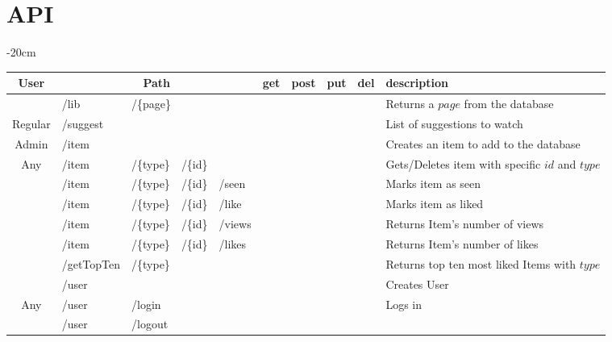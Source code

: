 \documentclass{article}
\newcommand{\xmark}{\ding{53}} %
\begin{document}
\section{API}
\label{sec:api}
\begin{table}[H]
  \centering
  \addtolength{\leftskip} {-20cm}
  \addtolength{\rightskip}{-20cm}
  \begin{adjustbox}{width=1.6\textwidth}
  \begin{tabular}{ c|l l l l|c|c|c|c|l }
    \rowcolor{Gray}
    User & \multicolumn{4}{c|}{Path} & get & post & put & del & description 
    \\ \hline
    & /lib & \multicolumn{3}{l|}{/\{page\}} &
    \xmark & & & &
    Returns a $page$ from the database
    \\
    \multirow{-2}{*}{Regular} & 
    \multicolumn{4}{l|}{/suggest} &
     & \xmark & & &
    List of suggestions to watch
    \\ \hhline{-|----|-|-|-|-|~} \rowcolor{Gray}
    Admin & /item & & & &
    & \xmark & & &
    Creates an item to add to the database
    \\ \hhline{-|----|-|-|-|-|~}
    Any &
    /item & /\{type\} & /\{id\} & &
    \xmark & & & \xmark &
    Gets/Deletes item with specific $id$ and $type$ 
    \\ \hhline{-|----|-|-|-|-|~} \rowcolor{Gray}
    & /item & /\{type\} & /\{id\} & /seen &
    & & \xmark & &
    Marks item as seen
    \\ \rowcolor{Gray}
    \multirow{-2}{*}{Regular}
    & /item & /\{type\} & /\{id\} & /like &
    & & \xmark & &
    Marks item as liked
    \\ \hhline{-|----|-|-|-|-|~}
    & /item & /\{type\} & /\{id\} & /views &
    \xmark & & & &
    Returns Item's number of views
    \\
    & /item & /\{type\} & /\{id\} & /likes &
    \xmark & & & &
    Returns Item's number of likes
    \\ 
    & /getTopTen & /\{type\} &  &  &
    \xmark & & & &
    Returns top ten most liked Items with $type$
    \\ 
    & \multicolumn{4}{l|}{/user} &
    & \xmark & & &
    Creates User
    \\
    \multirow{-5}{*}{Any} 
    & /user & \multicolumn{3}{l|}{/login} &
    \xmark & & & &
    Logs in
    \\ \hhline{-|----|-|-|-|-|~} \rowcolor{Gray}
    & /user & \multicolumn{3}{l|}{/logout} &

\end{tabular}
\end{adjustbox}
\end{table}
\end{document}
